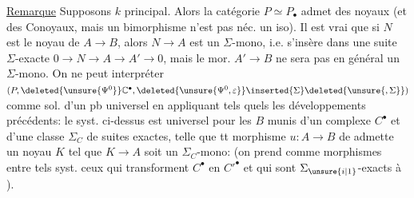 \uline{Remarque} Supposons $k$ principal. Alors la catégorie $P\simeq P_{\bullet}$  admet des \deleted{$\Sigma$} noyaux (et des Conoyaux,  mais un bimorphisme n'est pas néc. un iso).  Il est  vrai que si $N$ est le noyau de $A\longrightarrow B$, alors $N\longrightarrow A$ est un $\Sigma$-mono, i.e. s'insère dans une suite $\Sigma$-exacte $0\longrightarrow N\longrightarrow A\longrightarrow A'\longrightarrow0$, mais le mor. $A'\longrightarrow B$ ne sera pas en général un $\Sigma$-mono.  On ne peut interpréter $(P,\deleted{\unsure{\Psi^0}}\mathbb{C}^{\bullet},\deleted{\unsure{\Psi^0,\varepsilon}}\inserted{\Sigma}\deleted{\unsure{,\Sigma}})$ comme sol. d'un pb universel en appliquant tels quels les développements précédents:  le syst. ci-dessus est universel pour les $B$  munis d'un complexe  $C^{\bullet}$ et d'une classe $\Sigma_C$ de suites exactes, telle que tt morphisme $u:A\longrightarrow B$ de  admette un noyau $K$ tel que $K\longrightarrow A$ soit un $\Sigma_C$-mono: (on prend comme morphismes entre tels syst. ceux qui transforment $C^{\bullet}$ en $C'^{\bullet}$ et qui sont $\Sigma_{\unsure{i|1}}$-exacts à ).
